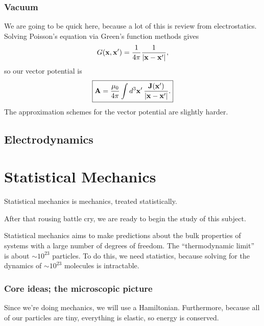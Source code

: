 \documentclass[11pt]{article}
\begin{document}
\subsubsection{Vacuum}

We are going to be quick here, because a lot of this is review from
electrostatics. Solving Poisson's equation via Green's function
methods gives
\begin{align*}
    G(\mathbf{x}, \mathbf{x}') = \frac{1}{4\pi} \frac{1}{|\mathbf{x} - \mathbf{x}'|}, 
\end{align*}
so our vector potential is
\begin{align*}
    \boxed{\mathbf{A} = \frac{\mu_0}{4\pi} \int d^3 \mathbf{x}' \, \frac{\mathbf{J}(\mathbf{x}')}{|\mathbf{x} - \mathbf{x}'|}.}
\end{align*}
The approximation schemes for the vector potential are slightly
harder.



\subsection{Electrodynamics}


\newpage

\section{Statistical Mechanics}

\begin{iidea}
    Statistical mechanics is mechanics, treated statistically.
\end{iidea}
After that rousing battle cry, we are ready to begin the study
of this subject.

Statistical mechanics aims to make predictions about the bulk properties
of systems with a large number of degrees of freedom. The ``thermodynamic
limit'' is about $\sim 10^{23}$ particles.  To do this, we need statistics, 
because solving for the dynamics of $\sim 10^{23}$ molecules is intractable.

\subsubsection{Core ideas; the microscopic picture}

Since we're doing mechanics, we will use a Hamiltonian. Furthermore,
because all of our particles are tiny, everything is elastic, so energy
is conserved.
\end{document}

